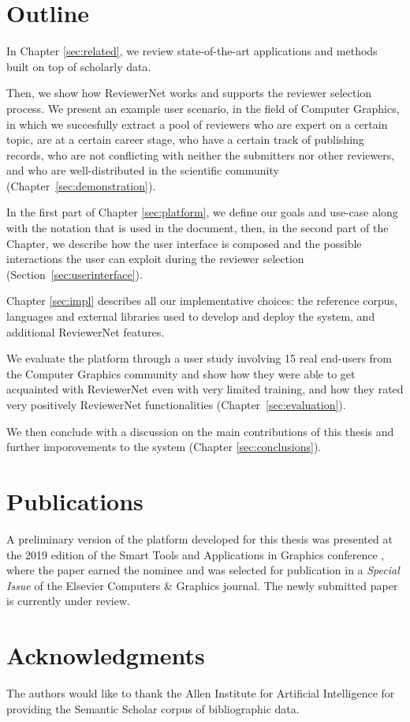 \section{Outline}

In Chapter \ref{sec:related}, we review state-of-the-art applications and methods built on top of scholarly data.

Then, we show how ReviewerNet works and supports the reviewer selection process.  We present an example user scenario, in the field of Computer Graphics, in which we succesfully extract a pool of reviewers who are expert on a certain topic, are at a certain career stage, who have a certain track of publishing records, who are not conflicting with neither the submitters nor other reviewers, and who are well-distributed in the scientific community (Chapter~\ref{sec:demonstration}). 

In the first part of Chapter \ref{sec:platform}, we define our goals and use-case along with the notation that is used in the document, then, in the second part of the Chapter, we describe how the user interface is composed and the possible interactions the user can exploit during the reviewer selection (Section~\ref{sec:userinterface}). 

Chapter \ref{sec:impl} describes all our implementative choices: the reference corpus, languages and external libraries used to develop and deploy the system, and additional ReviewerNet features. 

We evaluate the platform through a user study involving 15 real end-users from the Computer Graphics community and show how they were able to get acquainted with ReviewerNet even with very limited training, and how they rated very positively ReviewerNet functionalities (Chapter~\ref{sec:evaluation}).  

We then conclude with a discussion on the main contributions of this thesis and further imporovements to the system (Chapter \ref{sec:conclusions}).

\section{Publications}

A preliminary version of the platform developed for this thesis was presented at the 2019 edition of the Smart Tools and Applications in Graphics conference \cite{stag19}, where the paper earned the  nominee and was selected for publication in a \emph{Special Issue} of the Elsevier Computers \& Graphics journal. The newly submitted paper is currently under review.

\section*{Acknowledgments}

The authors would like to thank the Allen Institute for Artificial Intelligence for providing the Semantic Scholar corpus of bibliographic data.